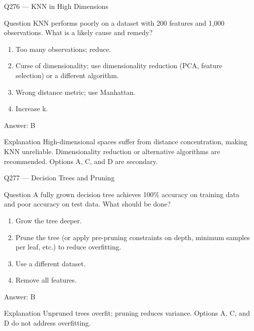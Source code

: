 \documentclass[aspectratio=169,8pt]{beamer}
\begin{document}
\begin{frame}{Q276 --- KNN in High Dimensions}
\begin{block}{Question}
KNN performs poorly on a dataset with 200 features and 1,000 observations. What is a likely cause and remedy?
\begin{enumerate} 
\item Too many observations; reduce.
\item Curse of dimensionality; use dimensionality reduction (PCA, feature selection) or a different algorithm.
\item Wrong distance metric; use Manhattan.
\item Increase k.
\end{enumerate}\end{block}
\begin{exampleblock}{Answer: B}\end{exampleblock}
\begin{block}{Explanation}
High-dimensional spaces suffer from distance concentration, making KNN unreliable. Dimensionality reduction or alternative algorithms are recommended. Options A, C, and D are secondary.
\end{block}
\end{frame}

\begin{frame}{Q277 --- Decision Trees and Pruning}
\begin{block}{Question}
A fully grown decision tree achieves 100\% accuracy on training data and poor accuracy on test data. What should be done?
\begin{enumerate}
\item Grow the tree deeper.
\item Prune the tree (or apply pre-pruning constraints on depth, minimum samples per leaf, etc.) to reduce overfitting.
\item Use a different dataset.
\item Remove all features.
\end{enumerate} \end{block}
\begin{exampleblock}{Answer: B}\end{exampleblock}
\begin{block}{Explanation}
Unpruned trees overfit; pruning reduces variance. Options A, C, and D do not address overfitting.
\end{block}
\end{frame}
\end{document}
